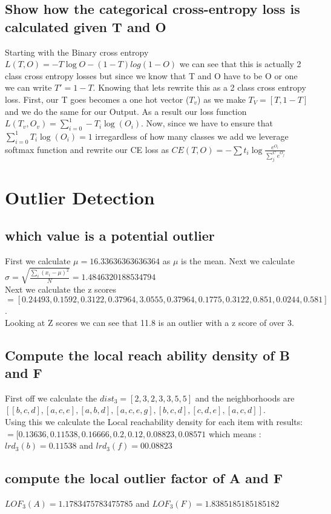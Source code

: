 \documentclass[11pt]{article}
\begin{document}
\subsection{Show how the categorical cross-entropy loss is calculated given T and O}
Starting with the Binary cross entropy $L(T,O) = -T \log O - (1-T) log(1-O)$ we can see that this is actually 2 class cross entropy losses but since we know that T and O have to be O or one we can write $T'=1-T$. Knowing that lets rewrite this as a 2 class cross entropy loss. First, our T goes becomes a one hot vector ($T_v$) as we make $T_V = [T, 1-T]$ and we do the same for our Output. As a result our loss function $L(T_v,O_v) = \sum_{i=0}^1 -T_i \log(O_i)$. Now, since we have to ensure that $\sum_{i=0}^1 T_i \log(O_i) = 1$ irregardless of how many classes we add we leverage softmax function and rewrite our CE loss as $CE(T,O) = - \sum t_i \log \frac{e^{O_i}}{\sum_j^C e^{O_j}}$
\section{Outlier Detection}
\subsection{which value is a potential outlier}
First we calculate $\mu=16.33636363636364$ as $\mu$ is the mean. Next we calculate $\sigma= \sqrt{\frac{\sum_i (x_i-\mu)^2}{N}}= 1.4846320188534794$\\ 
Next we calculate the z scores \\$=[ 0.24493,0.1592,0.3122,0.37964,3.0555,0.37964,0.1775, 0.3122,0.851,0.0244,0.581]$. \\ 
Looking at Z scores we can see that 11.8 is an outlier with a z score of over 3.
\subsection{Compute the local reach ability density of B and F}
First off we calculate the $dist_3 = [2,3,2,3,3,5,5]$ and the neighborhoods are \\
$[[b,c,d],[a,c,e],[a,b,d],[a,c,e,g],[b,c,d],[c,d,e],[a,c,d]]$.\\
Using this we calculate the Local reachability density for each item with results:\\
$= [0.13636,0.11538, 0.16666, 0.2, 0.12, 0.08823, 0.08571$ which means : \\
$lrd_3(b)=0.11538$ and  $lrd_3(f)=00.08823$
\subsection{compute the local outlier factor of A and F}
$LOF_3(A) = 1.1783475783475785$ and $LOF_3(F)= 1.8385185185185182$
\end{document}
